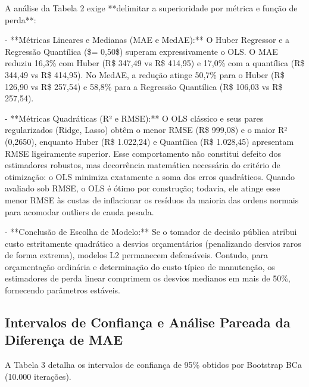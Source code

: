 \documentclass[12pt,a4paper]{article}
\begin{document}
A análise da Tabela 2 exige **delimitar a superioridade por métrica e função de perda**:

- **Métricas Lineares e Medianas (MAE e MedAE):** O Huber Regressor e a Regressão Quantílica (\$\tau = 0,50\$) superam expressivamente o OLS. O MAE reduziu 16,3\% com Huber (R\$ 347,49 vs R\$ 414,95) e 17,0\% com a quantílica (R\$ 344,49 vs R\$ 414,95). No MedAE, a redução atinge 50,7\% para o Huber (R\$ 126,90 vs R\$ 257,54) e 58,8\% para a Regressão Quantílica (R\$ 106,03 vs R\$ 257,54).

- **Métricas Quadráticas (R² e RMSE):** O OLS clássico e seus pares regularizados (Ridge, Lasso) obtêm o menor RMSE (R\$ 999,08) e o maior R² (0,2650), enquanto Huber (R\$ 1.022,24) e Quantílica (R\$ 1.028,45) apresentam RMSE ligeiramente superior. Esse comportamento não constitui defeito dos estimadores robustos, mas decorrência matemática necessária do critério de otimização: o OLS minimiza exatamente a soma dos erros quadráticos. Quando avaliado sob RMSE, o OLS é ótimo por construção; todavia, ele atinge esse menor RMSE às custas de inflacionar os resíduos da maioria das ordens normais para acomodar outliers de cauda pesada.

- **Conclusão de Escolha de Modelo:** Se o tomador de decisão pública atribui custo estritamente quadrático a desvios orçamentários (penalizando desvios raros de forma extrema), modelos L2 permanecem defensáveis. Contudo, para orçamentação ordinária e determinação do custo típico de manutenção, os estimadores de perda linear comprimem os desvios medianos em mais de 50\%, fornecendo parâmetros estáveis.


\subsection{Intervalos de Confiança e Análise Pareada da Diferença de MAE}

A Tabela 3 detalha os intervalos de confiança de 95\% obtidos por Bootstrap BCa (10.000 iterações).
\end{document}
